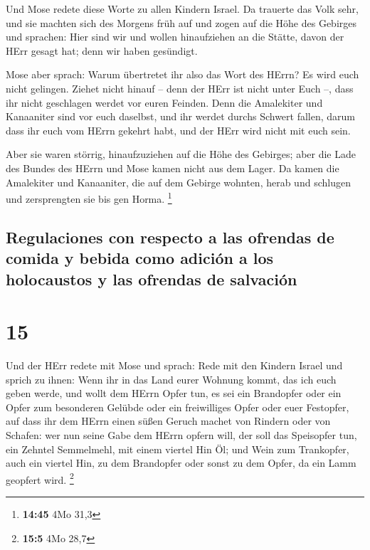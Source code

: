  Und Mose redete diese Worte zu allen Kindern Israel. Da
trauerte das Volk sehr,  und sie machten sich des Morgens
früh auf und zogen auf die Höhe des Gebirges und sprachen: Hier sind wir
und wollen hinaufziehen an die Stätte, davon der HErr gesagt hat; denn
wir haben gesündigt.

 Mose aber sprach: Warum übertretet ihr also das Wort des
HErrn? Es wird euch nicht gelingen.  Ziehet nicht hinauf
-- denn der HErr ist nicht unter Euch --, dass ihr nicht geschlagen
werdet vor euren Feinden.  Denn die Amalekiter und
Kanaaniter sind vor euch daselbst, und ihr werdet durchs Schwert fallen,
darum dass ihr euch vom HErrn gekehrt habt, und der HErr wird nicht mit
euch sein.

 Aber sie waren störrig, hinaufzuziehen auf die Höhe des
Gebirges; aber die Lade des Bundes des HErrn und Mose kamen nicht aus
dem Lager.  Da kamen die Amalekiter und Kanaaniter, die
auf dem Gebirge wohnten, herab und schlugen und zersprengten sie bis gen
Horma. \footnote{\textbf{14:45} 4Mo 31,3}

\hypertarget{regulaciones-con-respecto-a-las-ofrendas-de-comida-y-bebida-como-adiciuxf3n-a-los-holocaustos-y-las-ofrendas-de-salvaciuxf3n}{%
\subsection{Regulaciones con respecto a las ofrendas de comida y bebida
como adición a los holocaustos y las ofrendas de
salvación}\label{regulaciones-con-respecto-a-las-ofrendas-de-comida-y-bebida-como-adiciuxf3n-a-los-holocaustos-y-las-ofrendas-de-salvaciuxf3n}}

\hypertarget{section-14}{%
\section{15}\label{section-14}}

 Und der HErr redete mit Mose und sprach: 
Rede mit den Kindern Israel und sprich zu ihnen: Wenn ihr in das Land
eurer Wohnung kommt, das ich euch geben werde,  und wollt
dem HErrn Opfer tun, es sei ein Brandopfer oder ein Opfer zum besonderen
Gelübde oder ein freiwilliges Opfer oder euer Festopfer, auf dass ihr
dem HErrn einen süßen Geruch machet von Rindern oder von Schafen:
 wer nun seine Gabe dem HErrn opfern will, der soll das
Speisopfer tun, ein Zehntel Semmelmehl, mit einem viertel Hin Öl;
 und Wein zum Trankopfer, auch ein viertel Hin, zu dem
Brandopfer oder sonst zu dem Opfer, da ein Lamm geopfert wird.
\footnote{\textbf{15:5} 4Mo 28,7}

